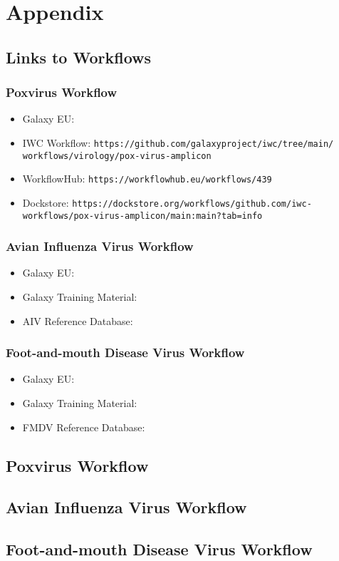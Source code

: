 \chapter*{Appendix}\label{chap:appendix}
\section{Links to Workflows}\label{sec:apx-links}
\subsection*{Poxvirus Workflow}
\begin{itemize}
	\setlength{\itemsep}{-0.4cm}
	\item Galaxy EU: \texttt{}
	\item IWC Workflow: \texttt{https://github.com/galaxyproject/iwc/tree/main/\\workflows/virology/pox-virus-amplicon}
	\item WorkflowHub: \texttt{https://workflowhub.eu/workflows/439}
	\item Dockstore: \texttt{https://dockstore.org/workflows/github.com/iwc-\\workflows/pox-virus-amplicon/main:main?tab=info}
\end{itemize}

\subsection*{Avian Influenza Virus Workflow}
\begin{itemize}
	\setlength{\itemsep}{-0.4cm}
	\item Galaxy EU: \texttt{}
	\item Galaxy Training Material: \texttt{}
	\item AIV Reference Database: \texttt{}
\end{itemize}

\subsection*{Foot-and-mouth Disease Virus Workflow}
\begin{itemize}
	\setlength{\itemsep}{-0.4cm}
	\item Galaxy EU: \texttt{}
	\item Galaxy Training Material: \texttt{}
	\item FMDV Reference Database: \texttt{}
\end{itemize}

\section{Poxvirus Workflow}\label{sec:apx-pox}

\section{Avian Influenza Virus Workflow}\label{sec:apx-aiv}

\section{Foot-and-mouth Disease Virus Workflow}\label{sec:apx-fmdv}
